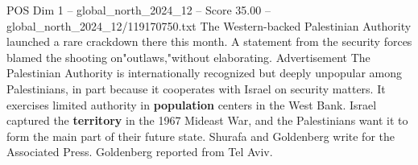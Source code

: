 \begin{textsample}{POS Dim 1 – global\_north\_2024\_12 – Score 35.00 – global\_north\_2024\_12/119170750.txt}
The Western-backed Palestinian Authority launched a rare crackdown there this month.
A statement from the security forces blamed the shooting on"outlaws,"without elaborating.
Advertisement The Palestinian Authority is internationally recognized but deeply unpopular among Palestinians, in part because it cooperates with Israel on security matters.
It exercises limited authority in \textbf{population} centers in the West Bank.
Israel captured the \textbf{territory} in the 1967 Mideast War, and the Palestinians want it to form the main part of their future state.
Shurafa and Goldenberg write for the Associated Press.
Goldenberg reported from Tel Aviv.

\end{textsample}
